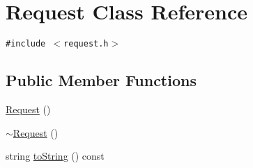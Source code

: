 \hypertarget{classRequest}{
\section{Request Class Reference}
\label{classRequest}
}
{\tt \#include $<$request.h$>$}

\subsection*{Public Member Functions}
\begin{CompactItemize}
\item 
\hyperlink{classRequest_faf8d8928de7ffff8a3767589489bd33}{Request} ()
\item 
\hyperlink{classRequest_4d57c725686701f773eb3630630a7ea2}{$\sim$Request} ()
\item 
string \hyperlink{classRequest_ac0f47abb968f811192430e89e098027}{toString} () const 
\end{CompactItemize}
